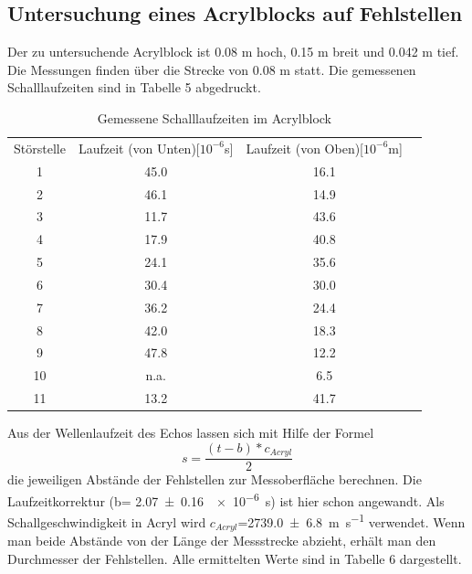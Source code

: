 \documentclass[11pt,ngerman,a4paper]{article}
\begin{document}
\subsection{Untersuchung eines Acrylblocks auf Fehlstellen}
Der zu untersuchende Acrylblock ist 0.08 m hoch, 0.15 m breit und 0.042 m tief. Die Messungen finden über die Strecke von 0.08 m statt. Die gemessenen Schalllaufzeiten sind in Tabelle 5 abgedruckt.

\begin{table}[H]
\centering
 \begin{tabular}{|c||c|c|c|}
Störstelle  & Laufzeit (von Unten)[$10^{-6}$s] & Laufzeit (von Oben)[$10^{-6}$m]\\
1 & 45.0 & 16.1  \\
2 & 46.1 & 14.9  \\
3 & 11.7 & 43.6  \\
4 & 17.9 & 40.8  \\
5 & 24.1 & 35.6  \\
6 & 30.4 & 30.0  \\
7 & 36.2 & 24.4  \\
8 & 42.0 & 18.3  \\
9 & 47.8 & 12.2  \\
10 & n.a. & 6.5  \\
11 & 13.2 & 41.7  \\
 \end{tabular}
\caption{Gemessene Schalllaufzeiten im Acrylblock}
\end{table}
\noindent
Aus der Wellenlaufzeit des Echos lassen sich mit Hilfe der Formel
\begin{equation}
s=\frac{(t-b)*c_{Acryl}}{2}
\end{equation}
die jeweiligen Abstände der Fehlstellen zur Messoberfläche berechnen. Die Laufzeitkorrektur (b=  \SI[per-mode=symbol]{2.07\pm0.16}{\num{e-6}\second}) ist hier schon angewandt. Als Schallgeschwindigkeit in Acryl wird $c_{Acryl}$=\SI[per-mode=symbol]{2739.0\pm6.8}{\metre\per\second} verwendet. Wenn man beide Abstände von der Länge der Messstrecke abzieht, erhält man den Durchmesser der Fehlstellen.  Alle ermittelten Werte sind in Tabelle 6 dargestellt.
\end{document}
